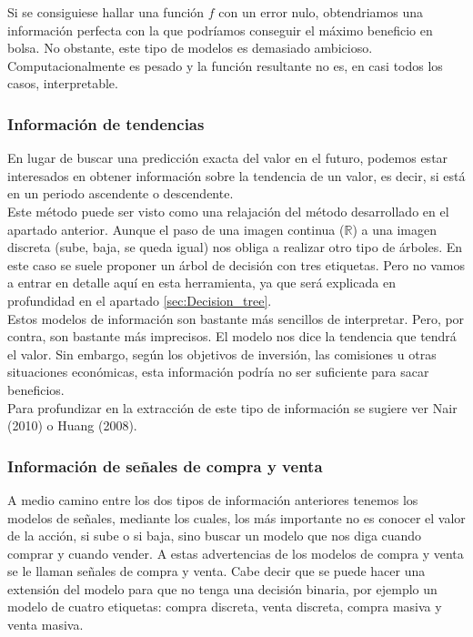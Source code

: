     Si se consiguiese hallar una funci\'on $f$ con un error nulo, obtendriamos una informaci\'on perfecta con la que podr\'iamos conseguir el m\'aximo beneficio en bolsa. No obstante, este tipo de modelos es demasiado ambicioso. Computacionalmente es pesado y la funci\'on resultante no es, en casi todos los casos, interpretable.\\
     
     
     \subsubsection{Informaci\'on de tendencias}
     
     En lugar de buscar una predicci\'on exacta del valor en el futuro, podemos estar interesados en obtener informaci\'on sobre la tendencia de un valor, es decir, si est\'a en un periodo ascendente o descendente. \\
     
     Este m\'etodo puede ser visto como una relajaci\'on del m\'etodo desarrollado en el apartado anterior. Aunque el paso de una imagen continua ($\mathbb{R}$) a una imagen discreta (sube, baja, se queda igual) nos obliga a realizar otro tipo de \'arboles. En este caso se suele proponer un \'arbol de decisi\'on con tres etiquetas. Pero no vamos a entrar en detalle aqu\'i en esta herramienta, ya que ser\'a explicada en profundidad en el apartado \ref{sec:Decision_tree}.\\
     
     Estos modelos de informaci\'on son bastante m\'as sencillos de interpretar. Pero, por contra, son bastante m\'as imprecisos. El modelo nos dice la tendencia que tendr\'a el valor. Sin embargo, seg\'un los objetivos de inversi\'on, las comisiones u otras situaciones econ\'omicas, esta informaci\'on podr\'ia no ser suficiente para sacar beneficios.\\
     
     Para profundizar en la extracci\'on de este tipo de informaci\'on se sugiere ver Nair (2010) o Huang (2008).\\
     
     
     \subsubsection{Informaci\'on de se\~nales de compra y venta}
     
     A medio camino entre los dos tipos de informaci\'on anteriores tenemos los modelos de señales, mediante los cuales, los m\'as importante no es conocer el valor de la acci\'on, si sube o si baja, sino buscar un modelo que nos diga cuando comprar y cuando vender. A estas advertencias de los modelos de compra y venta se le llaman se\~nales de compra y venta. Cabe decir que se puede hacer una extensi\'on del modelo para que no tenga una decisi\'on binaria, por ejemplo un modelo de cuatro etiquetas: compra discreta, venta discreta, compra masiva y venta masiva. \\
     
